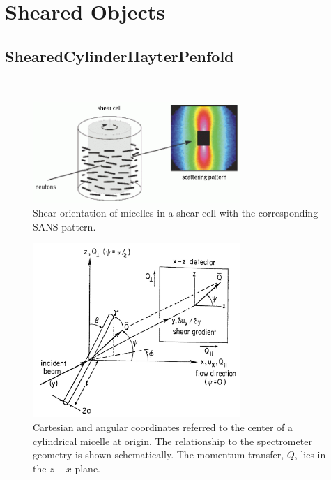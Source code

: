 \newpage
\section{Sheared Objects}

\subsection{ShearedCylinderHayterPenfold \cite{Hayter1984}}
\label{sect:ShearedCylinderHayterPenfold}
\hspace{1pt}\\

\begin{figure}[htb]
\begin{center}
\includegraphics[width=0.7\textwidth,height=0.3\textwidth]{sheared_cylinders1.png}
\end{center}
\caption{Shear orientation of micelles in a shear cell with the
corresponding SANS-pattern.} \label{sheared_cylinders1}
\end{figure}

\begin{figure}[htb]
\begin{center}
\includegraphics[width=0.7\textwidth,height=0.7\textwidth]{shear_cuette_SANS_geometry.png}
\end{center}
\caption{Cartesian and angular coordinates referred to the center
of a cylindrical micelle at origin. The relationship to the
spectrometer geometry is shown schematically. The momentum
transfer, $Q$, lies in the $z-x$ plane.}
\label{shear_cuette_SANS_geometry}
\end{figure}

